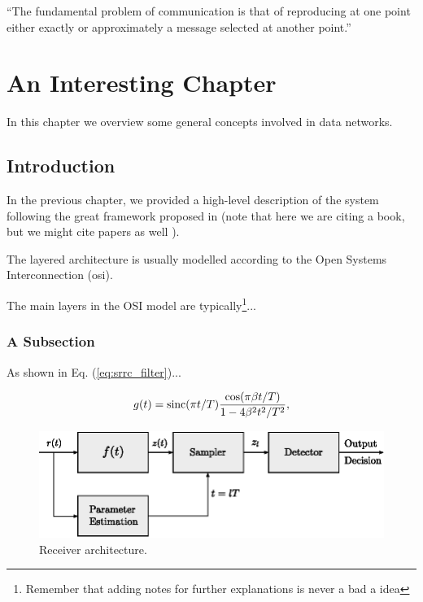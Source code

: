 \begin{savequote}[0.55\linewidth]
  ``The fundamental problem of communication is that of reproducing at one point either exactly or approximately a message selected at another point.''
\end{savequote}


\chapter{An Interesting Chapter} %
\label{cha:interesting_chapter}
\minitoc

%
%
In this chapter we overview some general concepts involved in data networks.

\section{Introduction} %
\label{sec:introduction_to_the_problem}

In the previous chapter, we provided a high-level description of the system following the
great framework proposed in \cite{Bertsekas1992} (note that here we are citing a book, but
we might cite papers as well \cite{Capetanakis1979}). 

The layered architecture is usually modelled according to the Open Systems Interconnection (\acrshort{osi}).

The main layers in the OSI model are typically\footnote{Remember that adding notes for further explanations is never a bad a idea}... 


\subsection{A Subsection} %
\label{sub:a_subsection}

As shown in Eq. (\ref{eq:srrc_filter})...

\begin{equation}
	g(t) = \operatorname{sinc}(\pi t/ T) \frac{\cos(\pi \beta t/T)} {1 - 4 \beta^2 t^2 / T^2}, 
	\label{eq:srrc_filter}
\end{equation}

\begin{figure}[]
	\centering
	\includegraphics[scale=0.7]{fig/receiver.eps}
	\caption{Receiver architecture.}
	\label{fig:rx_arch}
\end{figure} 

